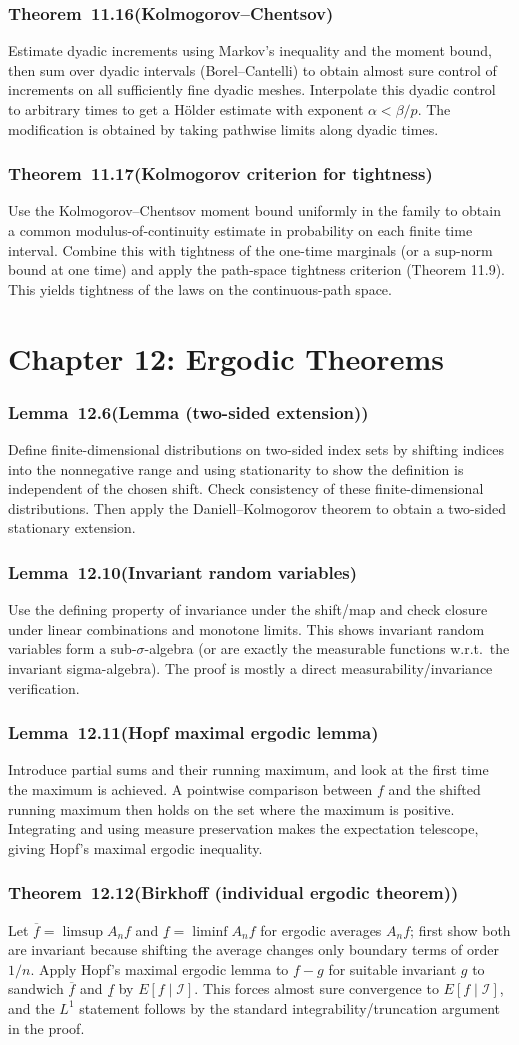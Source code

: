 \documentclass[11pt,a4paper]{article}
\newcommand{\proofcapsule}[4]{%
  \subsubsection*{#1~#2\quad \textnormal{\small(#3)}}%
  #4}
\begin{document}
\proofcapsule{Theorem}{11.16}{Kolmogorov--Chentsov}{Estimate dyadic increments using Markov's inequality and the moment bound, then sum over dyadic intervals (Borel--Cantelli) to obtain almost sure control of increments on all sufficiently fine dyadic meshes. Interpolate this dyadic control to arbitrary times to get a Hölder estimate with exponent $\alpha<\beta/p$. The modification is obtained by taking pathwise limits along dyadic times.}
\proofcapsule{Theorem}{11.17}{Kolmogorov criterion for tightness}{Use the Kolmogorov--Chentsov moment bound uniformly in the family to obtain a common modulus-of-continuity estimate in probability on each finite time interval. Combine this with tightness of the one-time marginals (or a sup-norm bound at one time) and apply the path-space tightness criterion (Theorem 11.9). This yields tightness of the laws on the continuous-path space.}
\section{Chapter 12: Ergodic Theorems}
\proofcapsule{Lemma}{12.6}{Lemma (two-sided extension)}{Define finite-dimensional distributions on two-sided index sets by shifting indices into the nonnegative range and using stationarity to show the definition is independent of the chosen shift. Check consistency of these finite-dimensional distributions. Then apply the Daniell--Kolmogorov theorem to obtain a two-sided stationary extension.}
\proofcapsule{Lemma}{12.10}{Invariant random variables}{Use the defining property of invariance under the shift/map and check closure under linear combinations and monotone limits. This shows invariant random variables form a sub-$\sigma$-algebra (or are exactly the measurable functions w.r.t.\ the invariant sigma-algebra). The proof is mostly a direct measurability/invariance verification.}
\proofcapsule{Lemma}{12.11}{Hopf maximal ergodic lemma}{Introduce partial sums and their running maximum, and look at the first time the maximum is achieved. A pointwise comparison between $f$ and the shifted running maximum then holds on the set where the maximum is positive. Integrating and using measure preservation makes the expectation telescope, giving Hopf's maximal ergodic inequality.}
\proofcapsule{Theorem}{12.12}{Birkhoff (individual ergodic theorem)}{Let $\overline f=\limsup A_n f$ and $\underline f=\liminf A_n f$ for ergodic averages $A_n f$; first show both are invariant because shifting the average changes only boundary terms of order $1/n$. Apply Hopf's maximal ergodic lemma to $f-g$ for suitable invariant $g$ to sandwich $\overline f$ and $\underline f$ by $E[f\mid\mathcal I]$. This forces almost sure convergence to $E[f\mid\mathcal I]$, and the $L^1$ statement follows by the standard integrability/truncation argument in the proof.}
\end{document}
